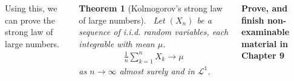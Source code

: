 \documentclass{tikzposter} %
\newtheorem{theorem}{Theorem}
\begin{document}
\begin{columns}
{{      Using this, we can prove the strong law of large numbers.
      \begin{theorem}[Kolmogorov's strong law of large numbers]
      \ Let $(X_{n})$ be a sequence of i.i.d. random variables, each integrable with mean $\mu$.
      \begin{align*}
        \frac{1}{n} \sum_{k=1}^{n} X_{k} \to \mu
      \end{align*}
      as $n \to \infty$ almost surely and in $\mathcal{L}^{1}$.
      \end{theorem}
      \hphantom{}

      \textbf{Prove, and finish non-examinable material in Chapter 9}
    }

  }
\end{columns}
\end{document}
